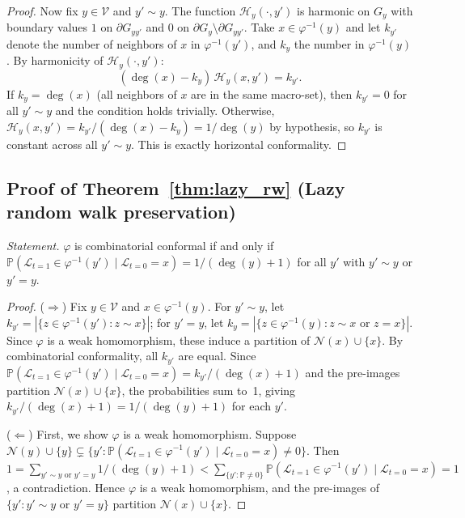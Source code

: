 \documentclass[twocolumn,superscriptaddress,tightenlines,aps,prx,floatfix]{revtex4-2}
\begin{document}
\begin{bibunit}
\begin{proof}
Now fix $y \in \mathcal{V}$ and $y' \sim y$. The function $\mathcal{H}_y(\cdot, y')$ is harmonic on $G_y$ with boundary values $1$ on $\partial G_{yy'}$ and $0$ on $\partial G_y \setminus \partial G_{yy'}$. Take $x \in \varphi^{-1}(y)$ and let $k_{y'}$ denote the number of neighbors of $x$ in $\varphi^{-1}(y')$, and $k_y$ the number in $\varphi^{-1}(y)$. By harmonicity of $\mathcal{H}_y(\cdot, y')$:
\[
(\deg(x) - k_y)\,\mathcal{H}_y(x, y') = k_{y'}.
\]
If $k_y = \deg(x)$ (all neighbors of $x$ are in the same macro-set), then $k_{y'} = 0$ for all $y' \sim y$ and the condition holds trivially. Otherwise, $\mathcal{H}_y(x, y') = k_{y'}/(\deg(x) - k_y) = 1/\deg(y)$ by hypothesis, so $k_{y'}$ is constant across all $y' \sim y$. This is exactly horizontal conformality.
\end{proof}


\subsection{Proof of Theorem~\ref*{thm:lazy_rw} (Lazy random walk preservation)}

\textit{Statement.} $\varphi$ is combinatorial conformal if and only if $\mathbb{P}(\mathcal{L}_{t=1} \in \varphi^{-1}(y') \mid \mathcal{L}_{t=0} = x) = 1/(\deg(y)+1)$ for all $y'$ with $y' \sim y$ or $y' = y$.

\begin{proof}

\noindent ($\Rightarrow$) Fix $y \in \mathcal{V}$ and $x \in \varphi^{-1}(y)$. For $y' \sim y$, let $k_{y'} = |\{z \in \varphi^{-1}(y') : z \sim x\}|$; for $y' = y$, let $k_y = |\{z \in \varphi^{-1}(y) : z \sim x \text{ or } z = x\}|$. Since $\varphi$ is a weak homomorphism, these induce a partition of $\mathcal{N}(x) \cup \{x\}$. By combinatorial conformality, all $k_{y'}$ are equal. Since $\mathbb{P}(\mathcal{L}_{t=1} \in \varphi^{-1}(y') \mid \mathcal{L}_{t=0} = x) = k_{y'}/(\deg(x)+1)$ and the pre-images partition $\mathcal{N}(x) \cup \{x\}$, the probabilities sum to~1, giving $k_{y'}/(\deg(x)+1) = 1/(\deg(y)+1)$ for each $y'$.

\noindent ($\Leftarrow$) First, we show $\varphi$ is a weak homomorphism. Suppose $\mathcal{N}(y) \cup \{y\} \subsetneq \{y' : \mathbb{P}(\mathcal{L}_{t=1} \in \varphi^{-1}(y') \mid \mathcal{L}_{t=0} = x) \neq 0\}$. Then $1 = \sum_{y' \sim y \text{ or } y'=y} 1/(\deg(y)+1) < \sum_{\{y': \mathbb{P} \neq 0\}} \mathbb{P}(\mathcal{L}_{t=1} \in \varphi^{-1}(y') \mid \mathcal{L}_{t=0} = x) = 1$, a contradiction. Hence $\varphi$ is a weak homomorphism, and the pre-images of $\{y' : y' \sim y \text{ or } y' = y\}$ partition $\mathcal{N}(x) \cup \{x\}$.


\end{proof}
\end{bibunit}
\end{document}
